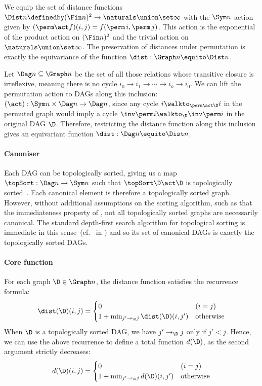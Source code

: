 We equip the set of distance functions $\Dist n \definedby (\Fin
n)^2 \to \naturals\union\set\infty$ with the $\Sym n$-action given by
\(
  (\perm\act f)(i, j) = f(\perm \, i, \perm \, j)
\).
This action is the exponential of the product action on
$(\Fin n)^2$ and the trivial action on $\naturals\union\set\infty$.
The preservation of distances under permutation is exactly the
equivariance of the function
\(
  \dist : \Graph n \equito \Dist n
\).

Let $\Dag n \subseteq \Graph n$ be the set of all those
relations whose transitive closure is irreflexive, meaning there is
no cycle $i_0 \to i_1 \to \cdots \to i_k \to i_0$. We can lift
the permutation action to DAGs along this inclusion: $(\act) : \Sym n \times \Dag n \to
\Dag n$, since any cycle $i \walkto_{\perm\act \D} i$ in the
permuted graph would imply a cycle $\inv\perm i \walkto_{\D}
\inv\perm i$ in the original DAG $\D$. Therefore, restricting the distance
function along this inclusion gives an
equivariant function \(
  \dist : \Dag n \equito \Dist n
\).


\paragraph{Canoniser}

Each DAG can be topologically sorted, giving us a map $\topSort : \Dag
n \to \Sym n$ such that $\topSort \D \act \D$ is topologically
sorted~\cite{cormen}. Each canonical element is therefore a
topologically sorted graph. However, without additional assumptions on
the sorting algorithm, such as that the immediateness property of
, not all topologically sorted graphs are
necessarily canonical. The standard depth-first search algorithm
for topological sorting is immediate in this sense~(cf.~ in ) and so
its set of canonical DAGs is exactly the topologically sorted DAGs.

\paragraph{Core function}
For each graph $\D \in \Graph n$, the distance function satisfies the recurrence formula:
\[
  \dist(\D)(i,j) =
  \begin{cases}
    0 & (i = j) \\
    1 + \min_{j' \to_{\D} j} \dist(\D)(i, j') & \text{otherwise}
  \end{cases}
\]
When $\D$ is a topologically sorted DAG, we have $j' \to_{\D}j$
only if $j' < j$. Hence, we can use the above recurrence to define a
total function $d(\D)$, as the second argument strictly decreases:
\[
  d(\D)(i,j) =
  \begin{cases}
    0 & (i = j) \\
    1 + \min_{j' \to_{\D} j} d(\D)(i, j') & \text{otherwise}
  \end{cases}
\]

